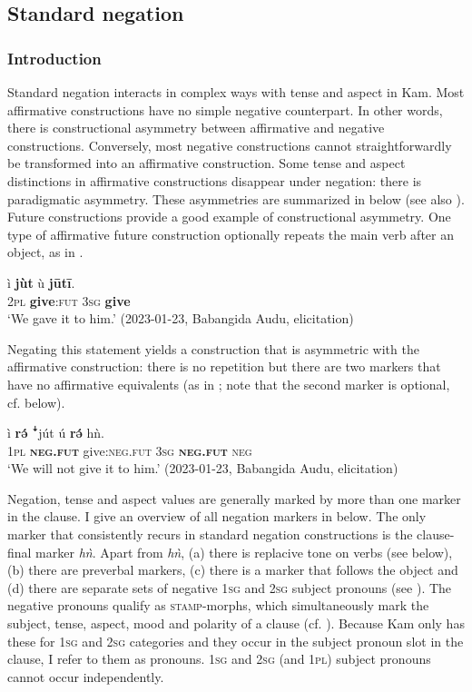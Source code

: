 \documentclass[output=paper,colorlinks,citecolor=brown]{langscibook}
\begin{document}
\subsection{Standard negation}\label{sec:kam:2.1}
\subsubsection{Introduction}\label{sec:kam:2.1.1}

Standard negation interacts in complex ways with tense and aspect in Kam. Most affirmative constructions have no simple negative counterpart. In other words, there is constructional asymmetry between affirmative and negative constructions. Conversely, most negative constructions cannot straightforwardly be transformed into an affirmative construction. Some tense and aspect distinctions in affirmative constructions disappear under negation: there is paradigmatic asymmetry. These asymmetries are summarized in  below (see also \citealt{Miestamo2005}). Future constructions provide a good example of constructional asymmetry. One type of affirmative future construction optionally repeats the main verb after an object, as in .

\ea\label{ex:kam:6} 
    \gll ì \textbf{jùt} ù \textbf{jūtī}.\\
        \textsc{2pl} \textbf{give}:\textsc{fut} 3\textsc{sg} \textbf{give}\\
    \glt ‘We gave it to him.’ (2023-01-23, Babangida Audu, elicitation)
\z 

Negating this statement yields a construction that is asymmetric with the affirmative construction: there is no repetition but there are two markers that have no affirmative equivalents (as in ; note that the second marker is optional, cf.  below).

\ea\label{ex:kam:7} 
    \gll ì \textbf{rə́} ꜜjút ú \textbf{rə́} hǹ.\\
        1\textsc{pl} \textbf{\textsc{neg.fut}} give:\textsc{neg.fut} 3\textsc{sg} \textbf{\textsc{neg.fut}} \textsc{neg}\\
    \glt ‘We will not give it to him.’ (2023-01-23, Babangida Audu, elicitation)
\z 

Negation, tense and aspect values are generally marked by more than one marker in the clause. I give an overview of all negation markers in  below. The only marker that consistently recurs in standard negation constructions is the clause-final marker \textit{hǹ}. Apart from \textit{hǹ}, (a) there is replacive tone on verbs (see  below), (b) there are preverbal markers, (c) there is a marker that follows the object and (d) there are separate sets of negative 1\textsc{sg} and 2\textsc{sg} subject pronouns (see ). The negative pronouns qualify as \textsc{stamp}{}-morphs, which simultaneously mark the subject, tense, aspect, mood and polarity of a clause (cf. \citealt{Anderson2016}). Because Kam only has these for 1\textsc{sg} and 2\textsc{sg} categories and they occur in the subject pronoun slot in the clause, I refer to them as pronouns. 1\textsc{sg} and 2\textsc{sg} (and 1\textsc{pl)} subject pronouns cannot occur independently.
\end{document}
